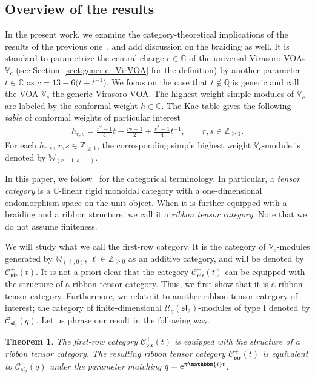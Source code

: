 \documentclass[10pt,a4paper]{amsart}
\numberwithin{equation}{section}
\newtheorem{thm}{Theorem}[section]
\newcommand{\bC}{\mathbb{C}}
\newcommand{\bQ}{\mathbb{Q}}
\newcommand{\bZ}{\mathbb{Z}}
\newcommand{\cC}{\mathcal{C}}
\newcommand{\cU}{\mathcal{U}}
\newcommand{\fsl}{\mathfrak{sl}}
\newcommand{\bbmi}{\mathbbm{i}}
\newcommand{\UEA}{\cU}
\newcommand{\Uq}{\UEA_{q}}
\newcommand{\catQG}{\cC_{\fsl_{2}}}
\newcommand{\catVir}{\cC_{\vir}}
\newcommand{\virvoa}{\mathbb{V}}
\newcommand{\virmod}{\mathbb{W}}
\newcommand{\vir}{\mathfrak{vir}}
\begin{document}
\subsection{Overview of the results}
In the present work, we examine the category-theoretical implications of the results of the previous one~\cite{KoshidaKytola2022},
and add discussion on the braiding as well.
It is standard to parametrize the central charge $c\in \bC$ of the universal Virasoro VOAs $\virvoa_{c}$ (see Section~\ref{sect:generic_VirVOA} for the definition)
by another parameter $t\in \bC$ as
$
	c = 13 - 6 \big(t + t^{-1}\big)$.
We focus on the case that $t\not\in\bQ$ is generic and call the VOA $\virvoa_{c}$ the generic Virasoro VOA.
The highest weight simple modules of $\virvoa_{c}$ are labeled by the conformal weight $h\in \bC$.
The Kac table gives the following {\it table} of conformal weights of particular interest
\begin{gather*}
	h_{r,s} = \frac{r^{2}-1}{4}t-\frac{rs-1}{2}+\frac{s^{2}-1}{4}t^{-1},\qquad r,s\in \bZ_{\geq 1}.
\end{gather*}
For each $h_{r,s}$, $r,s\in\bZ_{\geq 1}$, the corresponding simple highest weight $\virvoa_{c}$-module is denoted by $\virmod_{(r-1,s-1)}$.

In this paper, we follow~\cite{etingof2015tensor} for the categorical terminology.
In particular, a {\it tensor category} is a $\bC$-linear rigid monoidal category
with a one-dimensional endomorphism space on the unit object.
When it is further equipped with a braiding and a ribbon structure, we call it a {\it ribbon tensor category}.
Note that we do not assume finiteness.

We will study what we call the first-row category.
It is the category of $\virvoa_{c}$-modules generated by $\virmod_{(\ell,0)}$, $\ell \in\bZ_{\geq 0}$ as an additive category,
and will be denoted by $\catVir^{+}(t)$.
It is not a priori clear that the category $\catVir^{+}(t)$ can be equipped with the structure of a ribbon tensor category.
Thus, we first show that it is a ribbon tensor category.
Furthermore, we relate it to another ribbon tensor category of interest;
the category of finite-dimensional $\Uq(\fsl_{2})$-modules of type I denoted by $\catQG (q)$.
Let us phrase our result in the following way.

\begin{thm}
\label{thm:first-row-cat_QG}
The first-row category $\catVir^{+}(t)$ is equipped with the structure of a ribbon tensor category.
The resulting ribbon tensor category $\catVir^{+}(t)$ is equivalent to $\catQG(q)$
under the parameter matching $q = {\rm e}^{\pi \bbmi t}$.
\end{thm}
\end{document}
